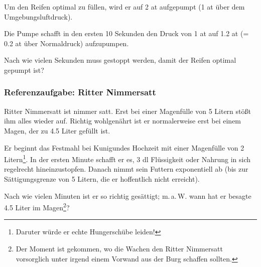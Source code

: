 Um den Reifen optimal zu füllen, wird er auf 2 at aufgepumpt (1 at
über dem Umgebungsluftdruck).

Die Pumpe schafft in den ersten 10 Sekunden den Druck von 1 at auf 1.2
at (= 0.2 at über Normaldruck) aufzupumpen.

Nach wie vielen Sekunden muss gestoppt werden, damit der Reifen
optimal gepumpt ist?

\newpage

\subsubsection{Referenzaufgabe: Ritter
  Nimmersatt}
Ritter Nimmersatt ist nimmer satt. Erst bei einer Magenfülle von
5 Litern stößt ihm alles wieder auf. Richtig wohlgenährt ist er
normalerweise erst bei einem Magen, der zu 4.5 Liter gefüllt ist.

Er beginnt das Festmahl bei Kunigundes Hochzeit mit einer Magenfülle
von 2 Litern\footnote{Daruter würde er echte Hungerschübe
  leiden!}. In der ersten Minute schafft er es, 3 dl Flüssigkeit oder Nahrung
in sich regelrecht hineinzustopfen. Danach nimmt sein Futtern
exponentiell ab (bis zur Sättigungsgrenze von 5 Litern, die er
hoffentlich nicht erreicht).

Nach wie vielen Minuten ist er so richtig gesättigt; m.\,a.\,W. wann
hat er besagte 4.5 Liter im Magen\footnote{Der Moment ist gekommen, wo
  die Wachen den Ritter Nimmersatt vorsorglich unter irgend einem Vorwand aus der Burg schaffen sollten.}?



\newpage
